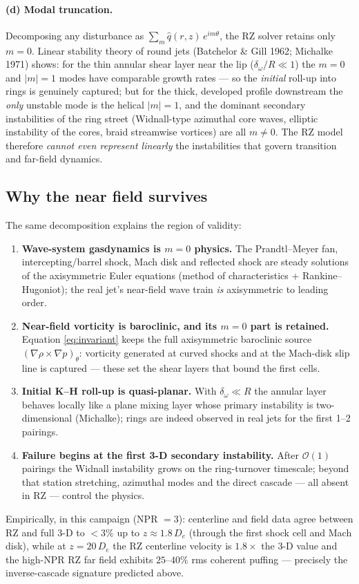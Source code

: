 \documentclass[11pt]{article}
\begin{document}
\paragraph{(d) Modal truncation.}
Decomposing any disturbance as $\sum_m \hat q(r,z)\,e^{im\theta}$, the
RZ solver retains only $m=0$. Linear stability theory of round jets
(Batchelor \& Gill 1962; Michalke 1971) shows: for the thin annular
shear layer near the lip ($\delta_\omega/R \ll 1$) the $m=0$ and
$|m|=1$ modes have comparable growth rates --- so the \emph{initial}
roll-up into rings is genuinely captured; but for the thick,
developed profile downstream the \emph{only} unstable mode is the
helical $|m|=1$, and the dominant secondary instabilities of the ring
street (Widnall-type azimuthal core waves, elliptic instability of
the cores, braid streamwise vortices) are all $m\neq0$. The RZ model
therefore \emph{cannot even represent linearly} the instabilities
that govern transition and far-field dynamics.

\subsection{Why the near field survives}
The same decomposition explains the region of validity:
\begin{enumerate}
\item \textbf{Wave-system gasdynamics is $m=0$ physics.} The
  Prandtl--Meyer fan, intercepting/barrel shock, Mach disk and
  reflected shock are steady solutions of the axisymmetric Euler
  equations (method of characteristics + Rankine--Hugoniot); the real
  jet's near-field wave train \emph{is} axisymmetric to leading order.
\item \textbf{Near-field vorticity is baroclinic, and its $m=0$ part
  is retained.} Equation \eqref{eq:invariant} keeps the full
  axisymmetric baroclinic source $(\nabla\rho\times\nabla p)_\theta$:
  vorticity generated at curved shocks and at the Mach-disk slip line
  is captured --- these set the shear layers that bound the first
  cells.
\item \textbf{Initial K--H roll-up is quasi-planar.} With
  $\delta_\omega \ll R$ the annular layer behaves locally like a plane
  mixing layer whose primary instability is two-dimensional
  (Michalke); rings are indeed observed in real jets for the first
  1--2 pairings.
\item \textbf{Failure begins at the first 3-D secondary instability.}
  After $\mathcal O(1)$ pairings the Widnall instability grows on the
  ring-turnover timescale; beyond that station stretching, azimuthal
  modes and the direct cascade --- all absent in RZ --- control the
  physics.
\end{enumerate}
Empirically, in this campaign (NPR $=3$): centerline and field data
agree between RZ and full 3-D to $<3\%$ up to $z\approx1.8\,D_e$
(through the first shock cell and Mach disk), while at $z=20\,D_e$
the RZ centerline velocity is $1.8\times$ the 3-D value and the
high-NPR RZ far field exhibits $25$--$40\%$ rms coherent puffing ---
precisely the inverse-cascade signature predicted above.
\end{document}

